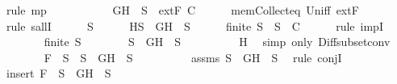 \begin{isabellebody}
\ {\isacharparenleft}rule\ mp{\isacharparenright}\isanewline
\ \ \ \ \isamarkupfalse%
\isanewline
\ \ \isamarkupfalse%
\isanewline
\ \ \isamarkupfalse%
\ {\isachardoublequoteopen}{\isacharbraceleft}G{\isacharcomma}H{\isacharbraceright}\ {\isasymunion}\ S\ {\isasymin}\ {\isacharparenleft}extF\ C{\isacharparenright}{\isachardoublequoteclose}\isanewline
\ \ \ \ \isamarkupfalse%
\ mem{\isacharunderscore}Collect{\isacharunderscore}eq\ Un{\isacharunderscore}iff\ extF\isanewline
\ \ \isamarkupfalse%
\ {\isacharparenleft}rule\ sallI{\isacharparenright}\isanewline
\ \ \ \ \isamarkupfalse%
\ S{\isacharprime}\isanewline
\ \ \ \ \isamarkupfalse%
\ H{\isacharcolon}{\isachardoublequoteopen}S{\isacharprime}\ {\isasymsubseteq}\ {\isacharbraceleft}G{\isacharcomma}H{\isacharbraceright}\ {\isasymunion}\ S{\isachardoublequoteclose}\isanewline
\ \ \ \ \isamarkupfalse%
\ {\isachardoublequoteopen}finite\ S{\isacharprime}\ {\isasymlongrightarrow}\ S{\isacharprime}\ {\isasymin}\ C{\isachardoublequoteclose}\isanewline
\ \ \ \ \isamarkupfalse%
\ {\isacharparenleft}rule\ impI{\isacharparenright}\isanewline
\ \ \ \ \ \ \isamarkupfalse%
\ {\isachardoublequoteopen}finite\ S{\isacharprime}{\isachardoublequoteclose}\isanewline
\ \ \ \ \ \ \isamarkupfalse%
\ {\isachardoublequoteopen}S{\isacharprime}\ {\isacharminus}\ {\isacharbraceleft}G{\isacharcomma}H{\isacharbraceright}\ {\isasymsubseteq}\ S{\isachardoublequoteclose}\isanewline
\ \ \ \ \ \ \ \ \isamarkupfalse%
\ H\ \isamarkupfalse%
\ {\isacharparenleft}simp\ only{\isacharcolon}\ Diff{\isacharunderscore}subset{\isacharunderscore}conv{\isacharparenright}\isanewline
\ \ \ \ \ \ \isamarkupfalse%
\ {\isachardoublequoteopen}F\ {\isasymin}\ S\ {\isasymand}\ {\isacharparenleft}S{\isacharprime}\ {\isacharminus}\ {\isacharbraceleft}G{\isacharcomma}H{\isacharbraceright}\ {\isasymsubseteq}\ S{\isacharparenright}{\isachardoublequoteclose}\isanewline
\ \ \ \ \ \ \ \ \isamarkupfalse%
\ assms{\isacharparenleft}{}{\isacharparenright}\ {\isacartoucheopen}S{\isacharprime}\ {\isacharminus}\ {\isacharbraceleft}G{\isacharcomma}H{\isacharbraceright}\ {\isasymsubseteq}\ S{\isacartoucheclose}\ \isamarkupfalse%
\ {\isacharparenleft}rule\ conjI{\isacharparenright}\isanewline
\ \ \ \ \ \ \isamarkupfalse%
\ \isamarkupfalse%
\ {\isachardoublequoteopen}insert\ F\ \ {\isacharparenleft}S{\isacharprime}\ {\isacharminus}\ {\isacharbraceleft}G{\isacharcomma}H{\isacharbraceright}{\isacharparenright}\ {\isasymsubseteq}\ S{\isachardoublequoteclose}\ \isanewline

\end{isabellebody}
